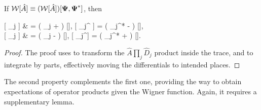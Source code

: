 \begin{theorem}
\label{thm:func-wigner:correspondences}
    If $\mathcal{W} [ \hat{A} ] \equiv (\mathcal{W} [ \hat{A} ]) [\boldsymbol{\Psi}, \boldsymbol{\Psi}^*]$, then
	\begin{eqn*}
		 [ \Psiop_j  ]
			& = \left( \Psi_j +   \right) ,
		\quad
		 [ \Psiop_j^\dagger {} ]
			= \left( \Psi_j^* -   \right) , \\
		 [  \Psiop_j ]
			& = \left( \Psi_j -   \right) ,
		\quad
		 [  \Psiop_j^\dagger ]
			= \left( \Psi_j^* +   \right) .
	\end{eqn*}
\end{theorem}
\begin{proof}
The proof uses  to transform the $ \prod_j \hat{D}_j$ product inside the trace, and  to integrate by parts, effectively moving the differentials to intended places.
\end{proof}

The second property complements the first one, providing the way to obtain expectations of operator products given the Wigner function.
Again, it requires a supplementary lemma.

